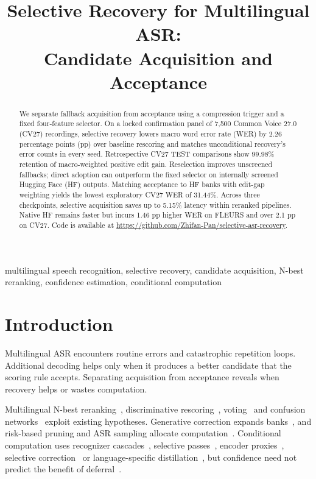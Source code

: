 \documentclass[conference,letterpaper]{IEEEtran}
\title{Selective Recovery for Multilingual ASR:\\Candidate Acquisition and Acceptance}
\begin{document}
\maketitle\flushbottom

\setlength{\abovedisplayskip}{3pt plus 2pt minus 1pt}
\setlength{\belowdisplayskip}{3pt plus 2pt minus 1pt}
\setlength{\belowdisplayshortskip}{3pt plus 2pt minus 1pt}
\setlength{\abovecaptionskip}{4pt}
\begin{abstract}
We separate fallback acquisition from acceptance using a compression trigger and a fixed four-feature selector. On a locked confirmation panel of 7,500 Common Voice 27.0 (CV27) recordings, selective recovery lowers macro word error rate (WER) by 2.26 percentage points (pp) over baseline rescoring and matches unconditional recovery's error counts in every seed. Retrospective CV27 TEST comparisons show 99.98\% retention of macro-weighted positive edit gain. Reselection improves unscreened fallbacks; direct adoption can outperform the fixed selector on internally screened Hugging Face (HF) outputs. Matching acceptance to HF banks with edit-gap weighting yields the lowest exploratory CV27 WER of 31.44\%. Across three checkpoints, selective acquisition saves up to 5.15\% latency within reranked pipelines. Native HF remains faster but incurs 1.46 pp higher WER on FLEURS and over 2.1 pp on CV27. Code is available at \url{https://github.com/Zhifan-Pan/selective-asr-recovery}.
\end{abstract}

\begin{IEEEkeywords}
multilingual speech recognition, selective recovery, candidate acquisition, N-best reranking, confidence estimation, conditional computation
\end{IEEEkeywords}

\section{Introduction}
Multilingual ASR encounters routine errors and catastrophic repetition loops. Additional decoding helps only when it produces a better candidate that the scoring rule accepts. Separating acquisition from acceptance reveals when recovery helps or wastes computation.

Multilingual N-best reranking~\cite{gaur2022,yan2025wild}, discriminative rescoring~\cite{rescorebert,discriminative2023,audioattention2019}, voting~\cite{fiscus1997} and confusion networks~\cite{mangu2000} exploit existing hypotheses. Generative correction expands banks~\cite{kuo2026framework,dutta2022,progres2024,whisperingllama}, and risk-based pruning and ASR sampling allocate computation~\cite{cheng2023pruning,jinnai2025mbrasr}. Conditional computation uses recognizer cascades~\cite{xue2025sima}, selective passes~\cite{aleksic2025}, encoder proxies~\cite{fathullah2024proxies}, selective correction~\cite{lim2025hybrid} or language-specific distillation~\cite{ferraz2024distil}, but confidence need not predict the benefit of deferral~\cite{jitkrittum2023cascade}.
\end{document}
